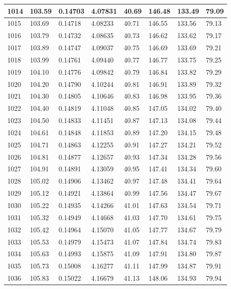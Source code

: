 \documentclass[12pt,a4paper,twoside]{article}
\begin{document}
\begin{center}
\begin{longtable}{l l l l | l l l l}
1014 & 103.59 & 0.14703 & 4.07831 & 40.69 & 146.48 & 133.49 & 79.09 \\ \hline
1015 & 103.69 & 0.14718 & 4.08233 & 40.71 & 146.55 & 133.56 & 79.13 \\ \hline
1016 & 103.79 & 0.14732 & 4.08635 & 40.73 & 146.62 & 133.62 & 79.17 \\ \hline
1017 & 103.89 & 0.14747 & 4.09037 & 40.75 & 146.69 & 133.69 & 79.21 \\ \hline
1018 & 103.99 & 0.14761 & 4.09440 & 40.77 & 146.77 & 133.75 & 79.25 \\ \hline
1019 & 104.10 & 0.14776 & 4.09842 & 40.79 & 146.84 & 133.82 & 79.29 \\ \hline
1020 & 104.20 & 0.14790 & 4.10244 & 40.81 & 146.91 & 133.89 & 79.32 \\ \hline
1021 & 104.30 & 0.14805 & 4.10646 & 40.83 & 146.98 & 133.95 & 79.36 \\ \hline
1022 & 104.40 & 0.14819 & 4.11048 & 40.85 & 147.05 & 134.02 & 79.40 \\ \hline
1023 & 104.50 & 0.14833 & 4.11451 & 40.87 & 147.13 & 134.08 & 79.44 \\ \hline
1024 & 104.61 & 0.14848 & 4.11853 & 40.89 & 147.20 & 134.15 & 79.48 \\ \hline
1025 & 104.71 & 0.14863 & 4.12255 & 40.91 & 147.27 & 134.21 & 79.52 \\ \hline
1026 & 104.81 & 0.14877 & 4.12657 & 40.93 & 147.34 & 134.28 & 79.56 \\ \hline
1027 & 104.91 & 0.14891 & 4.13059 & 40.95 & 147.41 & 134.34 & 79.60 \\ \hline
1028 & 105.02 & 0.14906 & 4.13462 & 40.97 & 147.48 & 134.41 & 79.64 \\ \hline
1029 & 105.12 & 0.14921 & 4.13864 & 40.99 & 147.56 & 134.47 & 79.67 \\ \hline
1030 & 105.22 & 0.14935 & 4.14266 & 41.01 & 147.63 & 134.54 & 79.71 \\ \hline
1031 & 105.32 & 0.14949 & 4.14668 & 41.03 & 147.70 & 134.61 & 79.75 \\ \hline
1032 & 105.42 & 0.14964 & 4.15070 & 41.05 & 147.77 & 134.67 & 79.79 \\ \hline
1033 & 105.53 & 0.14979 & 4.15473 & 41.07 & 147.84 & 134.74 & 79.83 \\ \hline
1034 & 105.63 & 0.14993 & 4.15875 & 41.09 & 147.91 & 134.80 & 79.87 \\ \hline
1035 & 105.73 & 0.15008 & 4.16277 & 41.11 & 147.99 & 134.87 & 79.91 \\ \hline
1036 & 105.83 & 0.15022 & 4.16679 & 41.13 & 148.06 & 134.93 & 79.94 \\ \hline

\end{longtable}
\end{center}
\end{document}
